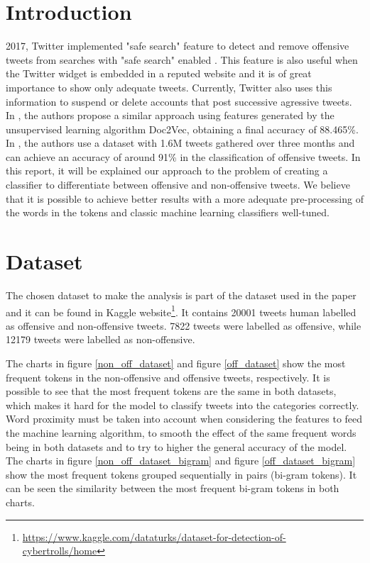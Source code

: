 \documentclass[journal]{IEEEtran}
\begin{document}
\section{Introduction}

 2017, Twitter implemented "safe search" feature to detect and remove offensive tweets from searches with "safe search" enabled \cite{Shah2017TwitterAndroid}. This feature is also useful when the Twitter widget is embedded in a reputed website and it is of great importance to show only adequate tweets. Currently, Twitter also uses this information to suspend or delete accounts that post successive agressive tweets.
In \cite{ShylajaSSAbhishekNarayananAbhijithVenugopal2017DocumentApproach}, the authors propose a similar approach using features generated by the unsupervised learning algorithm Doc2Vec, obtaining a final accuracy of 88.465\%. In \cite{DespoinaChatzakouNicolasKourtellisJeremyBlackburnEmilianoDeCristofaroGianlucaStringhini2017MeanTwitter}, the authors use a dataset with 1.6M tweets gathered over three months and can achieve an accuracy of around 91\% in the classification of offensive tweets.
In this report, it will be explained our approach to the problem of creating a classifier to differentiate between offensive and non-offensive tweets. We believe that it is possible to achieve better results with a more adequate pre-processing of the words in the tokens and classic machine learning classifiers well-tuned.

\section{Dataset}
The chosen dataset to make the analysis is part of the dataset used in the paper \cite{ShylajaSSAbhishekNarayananAbhijithVenugopal2017DocumentApproach} and it can be found in Kaggle website\footnote{\url{https://www.kaggle.com/dataturks/dataset-for-detection-of-cybertrolls/home}}. It contains 20001 tweets human labelled as offensive and non-offensive tweets. 7822 tweets were labelled as offensive, while 12179 tweets were labelled as non-offensive.

The charts in figure \ref{non_off_dataset} and figure \ref{off_dataset} show the most frequent tokens in the non-offensive and offensive tweets, respectively. It is possible to see that the most frequent tokens are the same in both datasets, which makes it hard for the model to classify tweets into the categories correctly. Word proximity must be taken into account when considering the features to feed the machine learning algorithm, to smooth the effect of the same frequent words being in both datasets and to try to higher the general accuracy of the model. The charts in figure \ref{non_off_dataset_bigram} and figure \ref{off_dataset_bigram} show the most frequent tokens grouped sequentially in pairs (bi-gram tokens). It can be seen the similarity between the most frequent bi-gram tokens in both charts.
\end{document}
